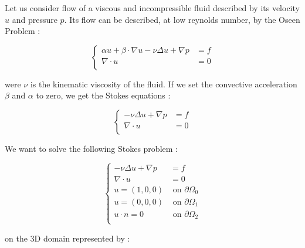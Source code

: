 %
%
%
%
%


Let us consider flow of a viscous and incompressible fluid described by its velocity $u$
and pressure $p$. Its flow can be described, at low reynolds number, by the Oseen Problem :

\begin{equation} \label{eqn-oseen}
\left\{
\begin{array}{lc}
\displaystyle \alpha u + \beta \cdot \nabla u - \nu \Delta u+
\nabla p & = f \\
\displaystyle \nabla \cdot u & = 0  \\
\end{array}
\right.
\end{equation}

were $\nu$ is the kinematic viscosity of the fluid. If we set the convective
acceleration $\beta$ and $\alpha$ to zero, we get the Stokes equations
 :

\begin{equation} \label{eqn-stokes}
\left\{
\begin{array}{lc}
- \nu \Delta u+
\nabla p & = f \\
\displaystyle \nabla \cdot u & = 0  \\
\end{array}
\right.
\end{equation}

We want to solve the following Stokes problem :

\begin{equation} \label{eqn-stokes}
\left\{
\begin{array}{lc}
\displaystyle - \nu \Delta u+
\nabla p & = f \\
\displaystyle \nabla \cdot u & = 0  \\
u = (1, 0, 0) & \mbox{ on } \partial \Omega_0 \\
u = (0, 0, 0) & \mbox{ on } \partial \Omega_1  \\
u \cdot n = 0 & \mbox { on } \partial \Omega_2\\
\end{array}
\right.
\end{equation}

on the 3D domain represented by :

\vspace{0.5cm}
\begin{center}

\end{center}
\vspace{0.5cm}

